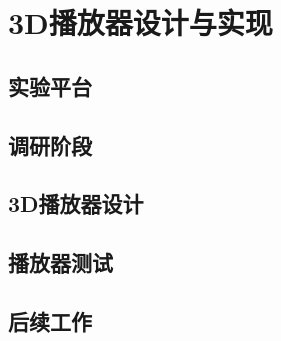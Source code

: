

\chapter{3D播放器设计与实现}
\label{cha:3Dplayerdesignandrealization}

\section{实验平台}
\label{sec:3dplayerhardwareplatform}


\section{调研阶段}
\label{sec:3Dplayersurvey}




\section{3D播放器设计}
\label{sec:3dplayerdesign}

\section{播放器测试}
\label{sec:3dplayerdemo}



\section{后续工作}
\label{sec:3dplayerfuturework}


